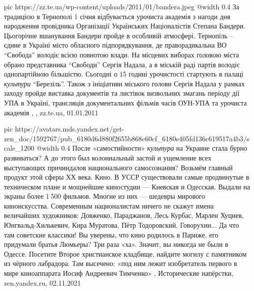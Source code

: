 \ifcmt
  pic https://zz.te.ua/wp-content/uploads/2011/01/bandera.jpeg
  @width 0.4
\fi
За традицією в Тернополі 1 січня відбувається урочиста академія з нагоди дня
народження провідника Організації Українських Націоналістів  Степана Бандери.
Цьогорічне вшанування Бандери пройде в особливій атмосфері. Тернопіль – єдине в
Україні місто обласного підпорядкування, де праворадикальна ВО \enquote{Свобода}
володіє всією повнотою влади. На місцевих виборах головою міста обрано
представника \enquote{Свободи} Сергія Надала, а в міській раді партія володіє
однопартійною більшістю.  Сьогодні о 15 годині урочистості стартують в палаці
\emph{культури} \enquote{Березіль}.  Також з ініціативи міського голови Сергія
Надала у рамках заходу пройде виставка документів та листівок визвольних
змагань періоду дії УПА в Україні, трансляція документальних фільмів часів
ОУН-УПА та урочиста академія
, 
, zz.te.ua, 01.01.2011

\ifcmt
  pic https://avatars.mds.yandex.net/get-zen_doc/1592767/pub_6180d6d880f2655b868c60cf_6180e405fd136c619517a4b3/scale_1200
  @width 0.4
\fi
После «самостийности» \emph{культура} на Украине стала бурно развиваться? А до
этого был колониальный застой и ущемление всех выступающих причиндалов
национального самосознания? Возьмём главный продукт этой сферы ХХ века. Кино. В
УССР существовали самые продвинутые в техническом плане и мощнейшие киностудии
— Киевская и Одесская. Выдали на экраны более 1 500 фильмов.  Многие из них —
шедевры мирового киноискусства. Современным националистам ничего не скажут
имена величайших художников: Довженко, Параджанов, Лесь Курбас, Марлен Хуциев,
Юнгвальд-Хилькевич, Кира Муратова, Пётр Тодоровский, Говорухин... Да что там
советские классики! Вы уверены, что кино родилось в Париже, его придумали
братья Люмьеры?  Три раза «ха». Значит, вы никогда не были в Одессе. Посетите
Второе христианское кладбище, найдите могилу с памятником из чёрного лабрадора.
Там высечено: «под ним лежит изобретатель первого в мире киноаппарата Иосиф
Андреевич Тимченко»
, 
Исторические напёрстки, zen.yandex.ru, 02.11.2021

